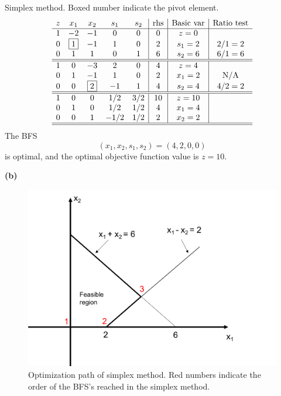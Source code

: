 \documentclass[12pt]{article}
\begin{document}
Simplex method. Boxed number indicate the pivot element.
\begin{equation*}
  \begin{array}{ccccc|c|c|c}
    z &  x_1      &  x_2 &  s_1 &  s_2 &   \text{rhs} & \text{Basic var} & \text{Ratio test} \\ \hline
    1 &   -2      &   -1 &    0 &    0 &     0        &  z=0             &                   \\
    0 & \boxed{1} &   -1 &    1 &    0 &     2        &  s_1 = 2         & 2/1=2             \\
    0 &    1      &    1 &    0 &    1 &     6        &  s_2 = 6         & 6/1=6             \\ \hline\hline
    
    1 &    0 &        -3 &    2 &    0 &     4        &  z=4             &                   \\
    0 &    1 &        -1 &    1 &    0 &     2        &  x_1 = 2         & \text{N/A}        \\
    0 &    0 & \boxed{2} &   -1 &    1 &     4        &  s_2 = 4         & 4/2=2             \\ \hline\hline
    
    1 &    0 &         0 &  1/2 &          3/2 &    10        &  z=10            &                   \\
    0 &    1 &         0 &  1/2 &          1/2 &     4        &  x_1 = 4         &          \\
    0 &    0 &         1 & -1/2 &          1/2 &     2        &  x_2 = 2         &          \\ \hline\hline
  \end{array}
\end{equation*}
The BFS \[ (x_1,x_2,s_1,s_2) = (4,2,0,0) \] is optimal, and the optimal objective function value is $z=10$.

\noindent
\textbf{(b)}

\begin{figure}[H]
    \centering
    \includegraphics[width=4.5in]{Picture1.png}
    \caption{Optimization path of simplex method. Red numbers indicate the order of the BFS's reached in the simplex method.}
    \label{fig:my_label}
\end{figure}
\end{document}

